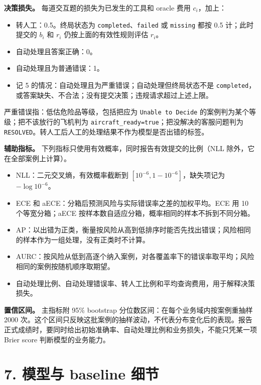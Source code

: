 \documentclass[11pt,a4paper]{article}
\providecommand{\tightlist}{\setlength{\itemsep}{3pt}\setlength{\parskip}{0pt}}
\begin{document}
\textbf{决策损失。} 每道交互题的损失为已发生的工具和 oracle 费用
\(c_i\)，加上：

\begin{itemize}
\tightlist
\item
  转人工：0.5。终局状态为 \texttt{completed}、\texttt{failed} 或
  \texttt{missing} 都按 0.5 计；此时提交的 \(b_i\) 和 \(r_i\)
  仍按上面的有效性规则评估 \(r_i\)。
\item
  自动处理且答案正确：0。
\item
  自动处理且为普通错误：1。
\item
  记 5 的情况：自动处理且为严重错误；自动处理但终局状态不是
  \texttt{completed}，或答案缺失、不合法；没有提交决策；违规请求超过上述上限。
\end{itemize}

严重错误指：低估危险品等级，包括把应为 \texttt{Unable\ to\ Decide}
的案例判为某个等级；把不该放行的飞机判为
\texttt{aircraft\_ready=true}；把没解决的客服问题判为
\texttt{RESOLVED}。转人工后人工的处理结果不作为模型是否出错的标签。

\textbf{辅助指标。} 下列指标只使用有效概率，同时报告有效提交的比例（NLL
除外，它在全部案例上计算）。

\begin{itemize}
\tightlist
\item
  NLL：二元交叉熵，有效概率截断到 \([10^{-6},1-10^{-6}]\)，缺失项记为
  \(-\log 10^{-6}\)。
\item
  ECE 和 aECE：分箱后预测风险与实际错误率之差的加权平均。ECE 用 10
  个等宽分箱；aECE 按样本数自适应分箱，概率相同的样本不拆到不同分箱。
\item
  AP：以出错为正类，衡量按风险从高到低排序时能否先找出错误；风险相同的样本作为一组处理，没有正类时不计算。
\item
  AURC：按风险从低到高逐个纳入案例，对各覆盖率下的错误率取平均；风险相同的案例按随机顺序取期望。
\item
  自动处理比例、自动处理错误率、转人工比例和平均查询费用，用于解释决策损失。
\end{itemize}

\textbf{置信区间。} 主指标附 95\% bootstrap
分位数区间：在每个业务域内按案例重抽样 2000
次。这个区间只反映这批案例的抽样波动，不代表分布变化后的表现。报告正式成绩时，要同时给出初始准确率、自动处理比例和业务损失，不能只凭某一项
Brier score 判断模型的业务能力。

\section{7. 模型与 baseline
细节}\label{ux6a21ux578bux4e0e-baseline-ux7ec6ux8282}
\end{document}
